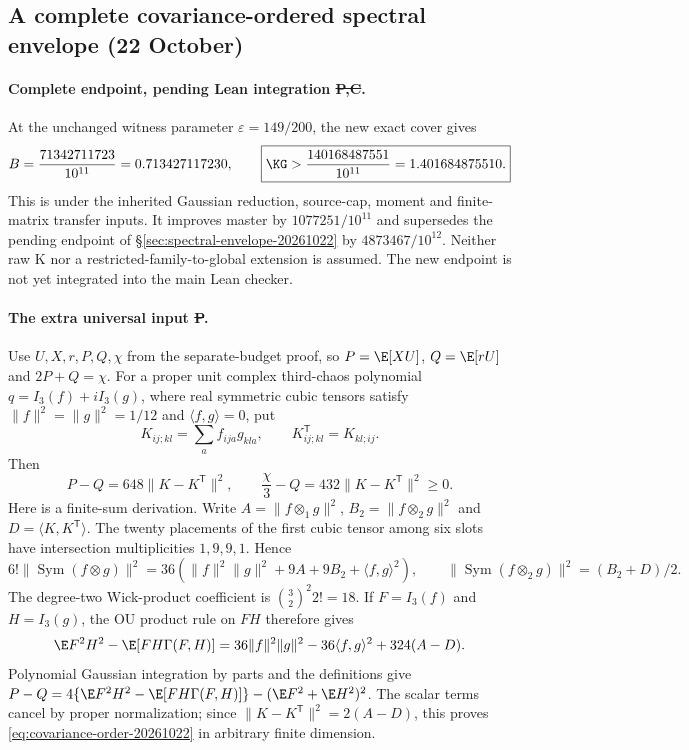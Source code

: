 \subsection{A complete covariance-ordered spectral envelope (22 October)}
\label{sec:covariance-envelope-20261022}

\paragraph{Complete endpoint, pending Lean integration \st{P,C}.}
At the unchanged witness parameter $\varepsilon=149/200$, the new exact
cover gives
\[
 B=\frac{71342711723}{10^{11}}=0.713427117230,\qquad
 \boxed{\KG>\frac{140168487551}{10^{11}}=1.401684875510.}
\]
This is under the inherited Gaussian reduction, source-cap, moment and
finite-matrix transfer inputs. It improves master by $1077251/10^{11}$
and supersedes the pending endpoint of
\S\ref{sec:spectral-envelope-20261022} by $4873467/10^{12}$.
Neither raw K nor a restricted-family-to-global extension is assumed.
The new endpoint is not yet integrated into the main Lean checker.

\paragraph{The extra universal input \st{P}.}
Use $U,X,r,P,Q,\chi$ from the separate-budget proof, so
$P=\E[XU]$, $Q=\E[rU]$ and $2P+Q=\chi$.
For a proper unit complex third-chaos polynomial $q=I_3(f)+iI_3(g)$,
where real symmetric cubic tensors satisfy
$\|f\|^2=\|g\|^2=1/12$ and $\langle f,g\rangle=0$, put
\[
 K_{ij;kl}=\sum_a f_{ija}g_{kla},\qquad K^{\mathsf T}_{ij;kl}=K_{kl;ij}.
\]
Then
\begin{equation}\label{eq:covariance-order-20261022}
 P-Q=648\|K-K^{\mathsf T}\|^2,\qquad
 \frac\chi3-Q=432\|K-K^{\mathsf T}\|^2\ge0.
\end{equation}
Here is a finite-sum derivation. Write $A=\|f\otimes_1g\|^2$,
$B_2=\|f\otimes_2g\|^2$ and $D=\langle K,K^{\mathsf T}\rangle$.
The twenty placements of the first cubic tensor among six slots have
intersection multiplicities $1,9,9,1$. Hence
\[
 6!\|\operatorname{Sym}(f\otimes g)\|^2
 =36(\|f\|^2\|g\|^2+9A+9B_2+\langle f,g\rangle^2),
 \qquad \|\operatorname{Sym}(f\otimes_2g)\|^2=(B_2+D)/2.
\]
The degree-two Wick-product coefficient is
$\binom32^2 2!=18$. If $F=I_3(f)$ and $H=I_3(g)$, the OU product rule
on $FH$ therefore gives
\[
 \E F^2H^2-\E[FH\Gamma(F,H)]
 =36\|f\|^2\|g\|^2-36\langle f,g\rangle^2+324(A-D).
\]
Polynomial Gaussian integration by parts and the definitions give
$P-Q=4\{\E F^2H^2-\E[FH\Gamma(F,H)]\}-(\E F^2+\E H^2)^2$.
The scalar terms cancel by proper normalization; since
$\|K-K^{\mathsf T}\|^2=2(A-D)$, this proves
\eqref{eq:covariance-order-20261022} in arbitrary finite dimension.

